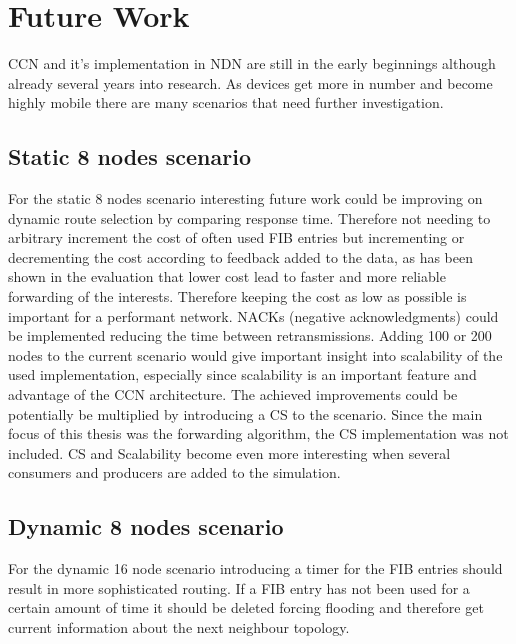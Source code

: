 \section{Future Work}

CCN and it's implementation in NDN are still in the early beginnings although already several years into research. As devices get more in number and become highly mobile there are many scenarios that need further investigation.

\subsection{Static 8 nodes scenario}

For the static 8 nodes scenario interesting future work could be improving on dynamic route selection by comparing response time. Therefore not needing to arbitrary increment the cost of often used FIB entries but incrementing or decrementing the cost according to feedback added to the data, as has been shown in the evaluation that lower cost lead to faster and more reliable forwarding of the interests. Therefore keeping the cost as low as possible is important for a performant network. NACKs (negative acknowledgments) could be implemented reducing the time between retransmissions. Adding 100 or 200 nodes to the current scenario would give important insight into scalability of the used implementation, especially since scalability is an important feature and advantage of the CCN architecture. The achieved improvements could be potentially be multiplied by introducing a CS to the scenario. Since the main focus of this thesis was the forwarding algorithm, the CS implementation was not included. CS and Scalability become even more interesting when several consumers and producers are added to the simulation.

\subsection{Dynamic 8 nodes scenario}

For the dynamic 16 node scenario introducing a timer for the FIB entries should result in more sophisticated routing. If a FIB entry has not been used for a certain amount of time it should be deleted forcing flooding and therefore get current information about the next neighbour topology.